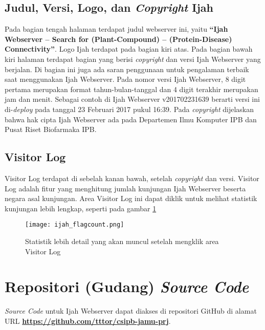	\subsection{Judul, Versi, Logo, dan \emph{Copyright} Ijah} \label{ssec:judul}
	Pada bagian tengah halaman terdapat judul webserver ini, yaitu \textbf{``Ijah Webserver -- Search for (Plant-Compound) -- (Protein-Disease) Connectivity''}. Logo Ijah terdapat pada bagian kiri atas. Pada bagian bawah kiri halaman terdapat bagian yang berisi \emph{copyright} dan versi Ijah Webserver yang berjalan. Di bagian ini juga ada saran penggunaan untuk pengalaman terbaik saat menggunakan Ijah Webserver. Pada nomor versi Ijah Webserver, 8 digit pertama merupakan format tahun-bulan-tanggal dan 4 digit terakhir merupakan jam dan menit. Sebagai contoh di Ijah Webserver v201702231639 berarti versi ini di-\emph{deploy} pada tanggal 23 Februari 2017 pukul 16:39. Pada \emph{copyright} dijelaskan bahwa hak cipta Ijah Webserver ada pada Departemen Ilmu Komputer IPB dan Pusat Riset Biofarmaka IPB.


	\subsection{Visitor Log} \label{ssec:visitor log}
	Visitor Log terdapat di sebelah kanan bawah, setelah \emph{copyright} dan versi. Visitor Log adalah fitur yang menghitung jumlah kunjungan Ijah Webserver beserta negara asal kunjungan. Area Visitor Log ini dapat diklik untuk melihat statistik kunjungan lebih lengkap, seperti pada gambar \ref{fig:ijah_flagcount}

	\begin{figure}[H]
	\centering
	\texttt{[image: ijah\_flagcount.png]}
	\caption{Statistik lebih detail yang akan muncul setelah mengklik area Visitor Log}
	\label{fig:ijah_flagcount}
	\end{figure}

\section{Repositori (Gudang) \emph{Source Code}} \label{sec:ws_source}
\emph{Source Code} untuk Ijah Webserver dapat diakses di repositori GitHub di alamat URL \href{https://github.com/tttor/csipb-jamu-prj}{\textbf{https://github.com/tttor/csipb-jamu-prj}}.

